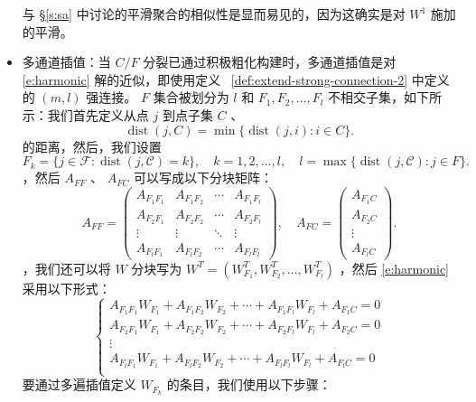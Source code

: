 \documentclass[12pt]{acta_2011xz}
\begin{document}
\begin{itemize}
\begin{equation}
        \end{equation}    与
   \S       \ref{s:sa}    中讨论的平滑聚合的相似性是显而易见的，因为这确实是对    $W^1$    施加的平滑。   \item   多通道插值：当    $C/F$    分裂已通过积极粗化构建时，多通道插值是对~    \eqref{e:harmonic}    解的近似，即使用定义~    \ref{def:extend-strong-connection-2}    中定义的    $(m, l)$    强连接。    $F$    集合被划分为 
   $l$    和 
   $F_1, F_2, \dots, F_l$    不相交子集，如下所示：我们首先定义从点    $j$    到点子集    $C$    、
   \[ 
        \operatorname{dist}(j, C)=\min  \{ \operatorname{dist}(j, i): i\in C \} .
        \]    的距离，然后，我们设置
   \[ 
        F_k= \{ j\in \mathcal F: \operatorname{dist}(j, \mathcal C)=k \} , \quad k=1, 2, \dots, l,\quad 
        l=\max  \{ \operatorname{dist}(j, \mathcal C): j\in F \} . 
       \]   ，然后    $A_{FF}$    、    $A_{FC}$    可以写成以下分块矩阵：
   \begin{equation}
            A_{FF}= \begin{pmatrix}
                    A_{F_1F_1} & A_{F_1F_2} & \cdots & A_{F_1F_l}  \\ 
                    A_{F_2F_1} & A_{F_2F_2} & \cdots & A_{F_2F_l}  \\  
                    \vdots & \vdots & \ddots & \vdots  \\ 
                    A_{F_lF_1} & A_{F_lF_2} & \cdots & A_{F_lF_l} 
            \end{pmatrix},\quad
            A_{FC} = \begin{pmatrix}
                A_{F_1C} \\ 
                A_{F_2C} \\ 
                \vdots  \\ 
                A_{F_lC}
                \end{pmatrix}.
        \end{equation}   ，我们还可以将    $W$    分块写为    $W^T=(W_{F_1}^T, W_{F_2}^T,\ldots,W_{F_l}^T)$   ，然后    \eqref{e:harmonic}    采用以下形式：
   \begin{equation}\label{multipass_intp_apprx}
            \left \{  \begin{array}{c}
                A_{F_1F_1}W_{F_1} +A_{F_1F_2}W_{F_2} +\cdots + A_{F_1F_l}W_{F_l}+A_{F_1C}=0 \\ 
                A_{F_2F_1}W_{F_1} +A_{F_2F_2}W_{F_2} +\cdots + A_{F_2F_l}W_{F_l}+A_{F_2C}=0 \\ 
                \vdots \\ 
                A_{F_lF_1}W_{F_1} +A_{F_lF_2}W_{F_2} +\cdots + A_{F_lF_l}W_{F_l}+A_{F_lC}=0 \\ 
            \end{array}
                \right.
        \end{equation}    要通过多遍插值定义    $W_{F_k}$    的条目，我们使用以下步骤：
   \begin{enumerate}


\end{enumerate}
\end{itemize}
\end{document}

